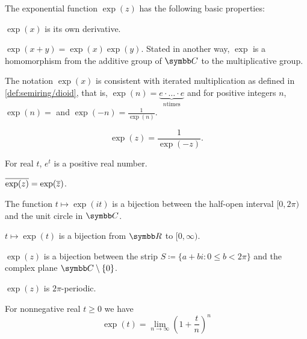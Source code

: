 \begin{proposition}\label{thm:exponential_function_properties}
  The exponential function \( \exp(z) \) has the following basic properties:

  \begin{thmenum}
     \( \exp(x) \) is its own derivative.

     \( \exp(x + y) = \exp(x) \exp(y) \). Stated in another way, \( \exp \) is a homomorphism from the additive group of \( \BC \) to the multiplicative group.

     The notation \( \exp(x) \) is consistent with iterated multiplication as defined in \cref{def:semiring/dioid}, that is, \( \exp(n) = \underbrace{e \cdot \ldots \cdot e}_{n \text{times}} \) and for positive integers \( n \), \( \exp(n) =  \) and \( \exp(-n) =\tfrac 1 {\exp(n)} \).

    \begin{equation*}
      \exp(z) = \frac 1 {\exp(-z)}.
    \end{equation*}

     For real \( t \), \( e^t \) is a positive real number.

     \( \overline{\exp(z)} = \exp(\overline{z}) \).

     The function \( t \mapsto \exp(it) \) is a bijection between the half-open interval \( [0, 2\pi) \) and the unit circle in \( \BC \).

     \( t \mapsto \exp(t) \) is a bijection from \( \BR \) to \( [0, \infty) \).

     \( \exp(z) \) is a bijection between the strip \( S \coloneqq \{ a + bi \colon 0 \leq b < 2\pi \} \) and the complex plane \( \BC \setminus \{ 0 \} \).

     \( \exp(z) \) is \( 2\pi \)-periodic.

     For nonnegative real \( t \geq 0 \) we have
    \begin{equation*}
      \exp(t) = \lim_{n \to \infty} \left(1 + \frac t n \right)^n
    \end{equation*}
  \end{thmenum}
\end{proposition}
